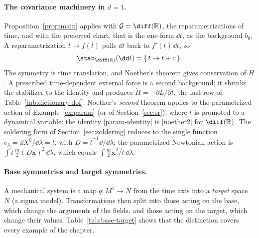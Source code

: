 \paragraph{The covariance machinery in $d=1$.}
Proposition~\ref{prop:main} applies with $\mathcal G=\diff(\mathbb R)$, the
reparametrizations of time, and with the preferred chart, that is the one-form
$\dd t$, as the background $b_0$. A reparametrization $t\to f(t)$ pulls $\dd t$
back to $f'(t)\,\dd t$, so
\begin{equation}
  \stab_{\diff(\mathbb R)}(\dd t)=\{\,t\to t+c\,\}.
\end{equation}
The symmetry is time translation, and Noether's theorem gives conservation of
$H$. A prescribed time-dependent external force is a second background; it
shrinks the stabilizer to the identity and produces $\dot H=-\partial L/\partial t$,
the last row of Table~\ref{tab:dictionary-dof}. Noether's \emph{second}
theorem applies to the parametrized action of Example~\ref{ex:param} (or of
Section~\ref{sec:sr}), where $t$ is promoted to a dynamical variable: the
identity \eqref{param-identity} is \eqref{noether2} for
$\diff(\mathbb R)$. The soldering form of Section~\ref{sec:soldering} reduces
to the single function $e_\lambda=\dd X^0/\dd\lambda=\dot t$, with
$D=\dot t^{-1}\dd/\dd\lambda$; the parametrized Newtonian action is
$\int\dot t\,\tfrac m2(D{\bm{x}})^2\,\dd\lambda$, which equals $\int\tfrac m2\dot{\bm{x}}^2/\dot t\,\dd\lambda$.

\paragraph{Base symmetries and target symmetries.}
A mechanical system is a map $q\colon M^1\to N$ from the time axis into a
\emph{target} space $N$ (a sigma model). Transformations then split into those
acting on the base, which change the arguments of the fields, and those acting
on the target, which change their values. Table~\ref{tab:base-target} shows
that the distinction covers every example of the chapter.

